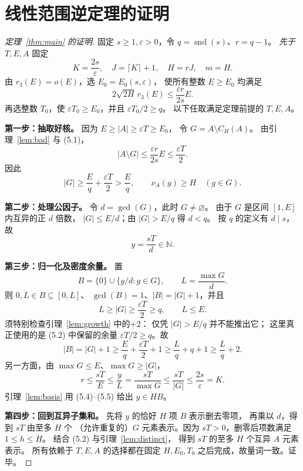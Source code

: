\documentclass[UTF8,a4paper,11pt,fontset=none]{ctexart}
\theoremstyle{remark}
\newcommand{\N}{\mathbb N}
\newcommand{\snd}{\operatorname{snd}}
\newcommand{\gcdop}{\operatorname{gcd}}
\newcommand{\eps}{\varepsilon}
\begin{document}
\section{线性范围逆定理的证明}
\begin{proof}[定理~\ref{thm:main} 的证明]
固定 $s\ge1,\eps>0$，令 $q=\snd(s)$、$r=q-1$。
\emph{先于} $T,E,A$ 固定
\[
 K=\frac{2s}{\eps},\quad
 J=\lceil K\rceil+1,\quad
 H=rJ,\quad m=H.
\]
由 $r_3(E)=o(E)$，选 $E_0=E_0(s,\eps)$，
使所有整数 $E\ge E_0$ 均满足
\[
  2\sqrt{2H}\,r_3(E)
       \le\frac{\eps r}{2s}E. \tag{5.1}
\]
再选整数 $T_0$，使
$\eps T_0\ge E_0$，并且 $\eps T_0/2\ge q$。
以下任取满足定理前提的 $T,E,A$。

\textbf{第一步：抽取好核。}
因为 $E\ge|A|\ge\eps T\ge E_0$，
令 $G=A\setminus C_H(A)$。
由引理~\ref{lem:bad} 与 (5.1)，
\[
 |A\setminus G|
 \le\frac{\eps r}{2s}E\le\frac{\eps T}{2}.
\]
因此
\[
 |G|\ge\frac Eq+\frac{\eps T}{2}>\frac Eq,
 \qquad \nu_A(g)\ge H\quad(g\in G). \tag{5.2}
\]

\textbf{第二步：处理公因子。}
令 $d=\gcdop(G)$，此时 $G\ne\varnothing$。
由于 $G$ 是区间 $[1,E]$ 内互异的正 $d$ 倍数，
$|G|\le E/d$；由 $|G|>E/q$ 得 $d<q$。
按 $q$ 的定义有 $d\mid s$，故
\[
   y=\frac{sT}{d}\in\N. \tag{5.3}
\]

\textbf{第三步：归一化及密度余量。}
置
\[
 B=\{0\}\cup\{g/d:g\in G\},\qquad
 L=\frac{\max G}{d}.
\]
则 $0,L\in B\subseteq[0,L]$、
$\gcdop(B)=1$、$|B|=|G|+1$，并且
\[
 L\ge|G|\ge\frac{\eps T}{2}\ge q,\qquad
 L\le E.
\]
须特别检查引理~\ref{lem:growth} 中的\textbf{$+2$}：
仅凭 $|G|>E/q$ 并不能推出它；
这里真正使用的是 (5.2) 中保留的余量
$\eps T/2\ge q$。故
\[
 |B|=|G|+1
 \ge \frac Eq+\frac{\eps T}{2}+1
 \ge \frac Lq+q+1
 \ge \frac Lq+2. \tag{5.4}
\]
另一方面，由 $\max G\le E$、$\max G\ge|G|$，
\[
 r\le\frac{sT}{E}
 \le\frac{y}{L}
 =\frac{sT}{\max G}
 \le\frac{sT}{|G|}
 \le\frac{2s}{\eps}=K. \tag{5.5}
\]
引理~\ref{lem:basis} 用 (5.4)--(5.5) 给出
$y\in HB$。

\textbf{第四步：回到互异子集和。}
先将 $y$ 的恰好 $H$ 项 $B$ 表示删去零项，
再乘以 $d$，得到 $sT$ 由至多 $H$ 个
（允许重复的）$G$ 元素表示。因为 $sT>0$，删零后项数满足 $1\le h\le H$。
结合 (5.2) 与引理~\ref{lem:distinct}，
得到 $sT$ 的至多 $H$ 个互异 $A$ 元素表示。
所有依赖于 $T,E,A$ 的选择都在固定 $H,E_0,T_0$
之后完成，故量词一致。证毕。
\end{proof}
\end{document}
